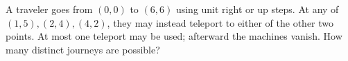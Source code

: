A traveler goes from $(0,0)$ to $(6,6)$ using unit right or up steps. At any of $(1,5),(2,4),(4,2)$, they may instead teleport to either of the other two points. At most one teleport may be used; afterward the machines vanish. How many distinct journeys are possible?
